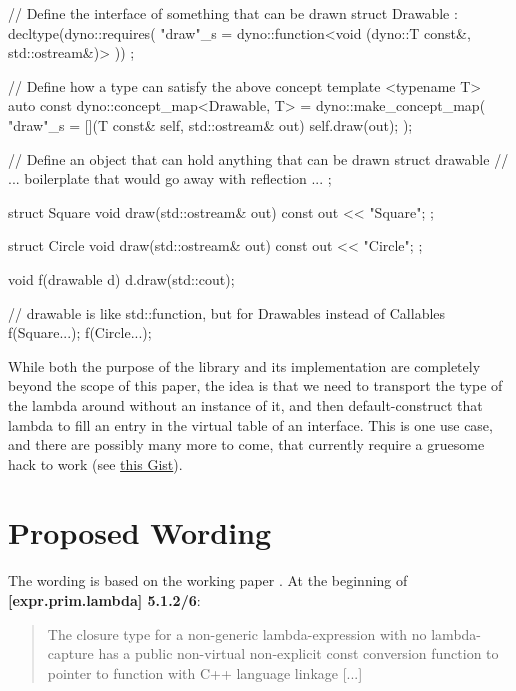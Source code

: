 \documentclass{wg21}
\begin{document}
\begin{cpp}
// Define the interface of something that can be drawn
struct Drawable : decltype(dyno::requires(
  "draw"_s = dyno::function<void (dyno::T const&, std::ostream&)>
)) { };

// Define how a type can satisfy the above concept
template <typename T>
auto const dyno::concept_map<Drawable, T> = dyno::make_concept_map(
  "draw"_s = [](T const& self, std::ostream& out) { self.draw(out); }
);

// Define an object that can hold anything that can be drawn
struct drawable {
  // ... boilerplate that would go away with reflection ...
};

struct Square {
  void draw(std::ostream& out) const { out << "Square"; }
};

struct Circle {
  void draw(std::ostream& out) const { out << "Circle"; }
};

void f(drawable d) {
  d.draw(std::cout);
}

// drawable is like std::function, but for Drawables instead of Callables
f(Square{...});
f(Circle{...});
\end{cpp}

While both the purpose of the library and its implementation are completely
beyond the scope of this paper, the idea is that we need to transport the
type of the lambda around without an instance of it, and then default-construct
that lambda to fill an entry in the virtual table of an interface. This is one
use case, and there are possibly many more to come, that currently require a
gruesome hack to work (see \href{https://github.com/ldionne/dyno/blob/03eaeded898225660787f03655edb89642a72e7c/include/dyno/detail/empty_object.hpp#L13}{this Gist}).


\section{Proposed Wording}
The wording is based on the working paper \cite{N4606}. At the beginning of
\textbf{[expr.prim.lambda] 5.1.2/6}:

\begin{quote}
   The closure type for a
  non-generic lambda-expression with no lambda-capture has a public non-virtual
  non-explicit const conversion function to pointer to function with C++ language
  linkage [...]
\end{quote}
\end{document}

